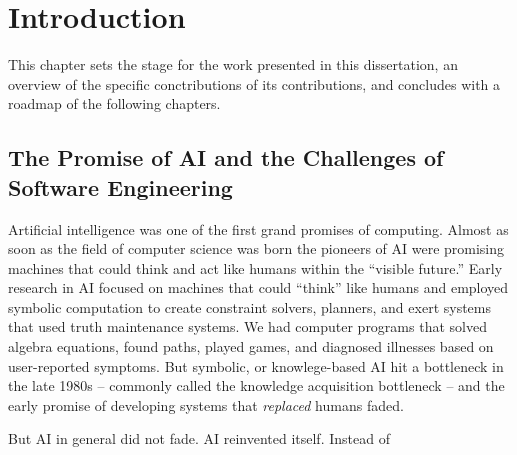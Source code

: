 \chapter{Introduction}

This chapter sets the stage for the work presented in this dissertation, an overview of the specific conctributions of its contributions, and concludes with a roadmap of the following chapters.

\section{The Promise of AI and the Challenges of Software Engineering}

Artificial intelligence was one of the first grand promises of computing. Almost as soon as the field of computer science was born the pioneers of AI were promising machines that could think and act like humans within the ``visible future.'' Early research in AI focused on machines that could ``think'' like humans and employed symbolic computation to create constraint solvers, planners, and exert systems that used truth maintenance systems. We had computer programs that solved algebra equations, found paths, played games, and diagnosed illnesses based on user-reported symptoms. But symbolic, or knowlege-based AI hit a bottleneck in the late 1980s -- commonly called the knowledge acquisition bottleneck -- and the early promise of developing systems that {\it replaced} humans faded.

But AI in general did not fade. AI reinvented itself. Instead of


